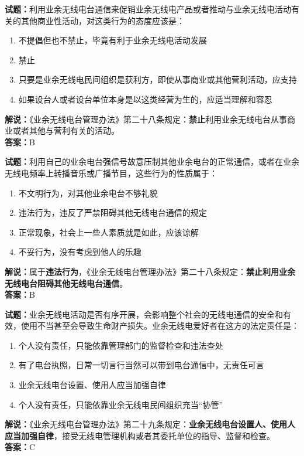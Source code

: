 \documentclass{ctexbook}
\begin{document}
\bigskip


\noindent\textbf{试题：}利用业余无线电台通信来促销业余无线电产品或者推动与业余无线电活动有关的其他商业性活动，对这类行为的态度应该是：
\begin{enumerate}[leftmargin=3em]
\item 不提倡但也不禁止，毕竟有利于业余无线电活动发展
\item 禁止
\item 只要是业余无线电民间组织是获利方，即使从事商业或其他营利活动，应支持
\item 如果设台人或者设台单位本身是以这类经营为生的，应适当理解和容忍
\end{enumerate}
\noindent\textbf{解说：}《业余无线电台管理办法》第二十八条规定：\textbf{禁止}利用业余无线电台从事商业或者其他与营利有关的活动。\\\noindent\textbf{答案：}B



\bigskip


\noindent\textbf{试题：}利用自己的业余电台强信号故意压制其他业余电台的正常通信，或者在业余无线电频率上转播音乐或广播节目，这些行为的性质属于：
\begin{enumerate}[leftmargin=3em]
\item 不文明行为，对其他业余电台不够礼貌
\item 违法行为，违反了严禁阻碍其他无线电台通信的规定
\item 正常现象，社会上一些人素质就是如此，应该谅解
\item 不妥行为，没有考虑到他人的乐趣
\end{enumerate}
\noindent\textbf{解说：}属于\textbf{违法行为}，《业余无线电台管理办法》第二十八条规定：\textbf{禁止利用业余无线电台阻碍其他无线电台通信}。\\\noindent\textbf{答案：}B



\bigskip


\noindent\textbf{试题：}业余无线电活动是否有序开展，会影响整个社会的无线电通信的安全和有效，使用不当甚至会导致生命财产损失。业余无线电爱好者在这方的法定责任是：
\begin{enumerate}[leftmargin=3em]
\item 个人没有责任，只能依靠管理部门的监督检查和违法查处
\item 有了电台执照，日常一切言行当然可以带到电台通信中，无责任可言
\item 业余无线电台设置、使用人应当加强自律
\item 个人没有责任，只能依靠业余无线电民间组织充当“协管”
\end{enumerate}
\noindent\textbf{解说：}《业余无线电台管理办法》第二十九条规定：\textbf{业余无线电台设置人、使用人应当加强自律}，接受无线电管理机构或者其委托单位的指导、监督和检查。\\\noindent\textbf{答案：}C
\end{document}
